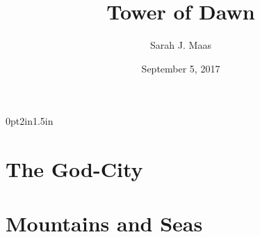 \documentclass[10pt, openany]{book}
\title{Tower of Dawn}
\author{Sarah J. Maas}
\date{September 5, 2017}
\begin{document}


\blankpage

\blankpage




\tableofcontents

\newpage


\newpage %
\pdfpagewidth=5.5in \pdfpageheight=8.25in \eject %
\titlespacing*{\chapter} {0pt}{2in}{1.5in} %

\part{The God-City}





























\part{Mountains and Seas}













































\end{document}
